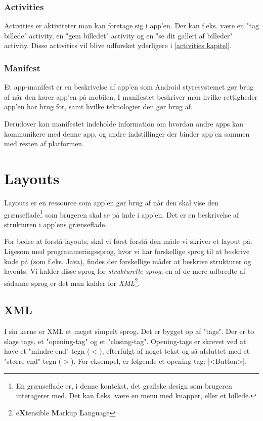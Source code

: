 \subsubsection{Activities}
Activities er aktiviteter man kan foretage sig i app'en. Der kan f.eks. være en "tag billede" activity, en "gem billedet" activity og en "se dit galleri af billeder" activity. Disse activities vil blive udforsket yderligere i \autoref{activities kapitel}.


\subsubsection{Manifest}
Et app-manifest er en beskrivelse af app'en som Android styresystemet gør brug af når den kører app'en på mobilen. I manifestet beskriver man hvilke rettigheder app'en har brug for, samt hvilke teknologier den gør brug af.

Derudover kan manifestet indeholde information om hvordan andre apps kan kommunikere med denne app, og andre indstillinger der binder app'en sammen med resten af platformen.

\section{Layouts}
\label{sec:android:layouts}

Layouts er en ressource som app'en gør brug af når den skal vise den grænseflade\footnote{En grænseflade er, i denne kontekst, det grafiske design som brugeren interagerer med. Det kan f.eks. være en menu med knapper, eller et billede.} som brugeren skal se på inde i app'en. Det er en beskrivelse af strukturen i app'ens grænseflade.

For bedre at forstå layouts, skal vi først forstå den måde vi skriver et layout på. Ligesom med programmeringssprog, hvor vi har forskellige sprog til at beskrive kode på (som f.eks. Java), findes der forskellige måder at beskrive strukturer og layouts. Vi kalder disse sprog for \textit{strukturelle sprog}, en af de mere udbredte af sådanne sprog er det man kalder for \textit{XML}\footnote{e\textbf{X}tensible \textbf{M}arkup \textbf{L}anguage}.

\subsection{XML}
I sin kerne er XML et meget simpelt sprog. Det er bygget op af "tags". Der er to slags tags, et "opening-tag" og et "closing-tag". Opening-tags er skrevet ved at have et "mindre-end" tegn ($<$), efterfulgt af noget tekst og så afsluttet med et "større-end" tegn ($>$). For eksempel, er følgende et opening-tag: \XmlInline|<Button>|.

